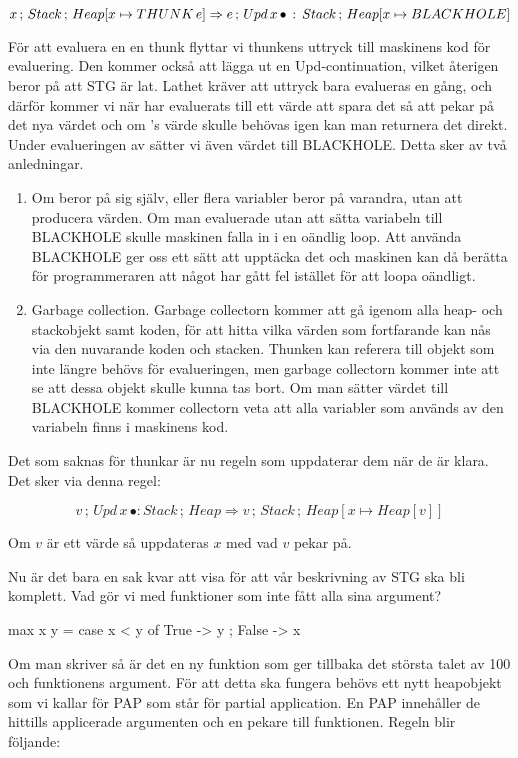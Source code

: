 \documentclass[../Core]{subfiles}
\begin{document}
\[
x\,;\, Stack\,;\, Heap[x\mapsto THUNK\,e]\Rightarrow e\,;\, Upd\, x\,\bullet\,:\, Stack\,;\, Heap[x\mapsto BLACKHOLE]\]

För att evaluera en en thunk flyttar vi thunkens uttryck till maskinens kod
för evaluering. Den kommer också att lägga ut en Upd-continuation, vilket
återigen beror på att STG är lat. Lathet kräver att uttryck bara evalueras
en gång, och därför kommer vi när  har evaluerats till ett värde att spara
det så att  pekar på det nya värdet och om 's värde skulle behövas
igen kan man returnera det direkt. Under evalueringen av  sätter
vi även värdet  till BLACKHOLE. Detta sker av två anledningar.
\begin{enumerate}
\item Om  beror på sig själv, eller flera variabler beror på varandra, utan
att producera värden. Om man evaluerade utan att sätta variabeln till BLACKHOLE
skulle maskinen falla in i en oändlig loop. Att använda BLACKHOLE ger oss ett sätt att
upptäcka det och maskinen kan då berätta för programmeraren att något har gått fel
istället för att loopa oändligt.
\item Garbage collection. Garbage collectorn kommer att gå igenom alla heap- och stackobjekt
samt koden, för att hitta vilka värden som fortfarande kan nås via den nuvarande
koden och stacken. Thunken kan referera till objekt som inte längre
behövs för evalueringen, men garbage collectorn kommer inte att se att dessa objekt skulle
kunna tas bort. Om man sätter värdet till BLACKHOLE
kommer collectorn veta att alla variabler som används av den variabeln finns
i maskinens kod.
\end{enumerate}
Det som saknas för thunkar är nu regeln som uppdaterar dem när de
är klara. Det sker via denna regel:

\[
v\,;\, Upd\, x\,\bullet:Stack\,;\, Heap\Rightarrow v\,;\, Stack\,;\, Heap[x\mapsto Heap[v]]\]

Om $v$ är ett värde så uppdateras $x$ med vad $v$ pekar på.

Nu är det bara en sak kvar att visa för att vår beskrivning av STG ska bli komplett.
Vad gör vi med funktioner som inte fått alla sina argument?

\begin{codeEx}
max x y = case x < y of
    { True  -> y
    ; False -> x
    }
\end{codeEx}

Om man skriver  så är det en ny funktion som
ger tillbaka det största talet av 100 och funktionens argument. För att
detta ska fungera behövs ett nytt heapobjekt som vi kallar för PAP som står för partial
application. En PAP innehåller de hittills applicerade argumenten och en pekare till funktionen.
Regeln blir följande:
\end{document}
